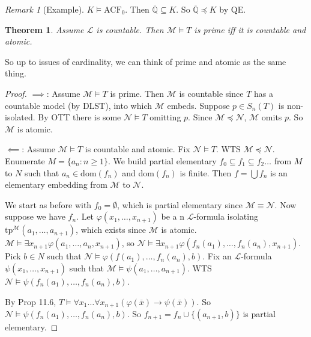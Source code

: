 \documentclass[]{article}
\theoremstyle{custhm}
\newtheorem{theorem}{Theorem}[section]
\theoremstyle{cusdef}
\theoremstyle{custhm}
\theoremstyle{custhm}
\theoremstyle{custhm}
\theoremstyle{ex}
\theoremstyle{custhm}
\theoremstyle{cusdef}
\theoremstyle{remark}
\newtheorem*{remark*}{Remark}
\theoremstyle{remark}
\newcommand{\Q}{\mathbb{Q}}
\newcommand{\ra}{\rightarrow}
\renewcommand{\L}{\mathcal{L}}
\newcommand{\M}{\mathcal{M}}
\renewcommand{\phi}{\varphi}
\renewcommand{\bar}{\overline}
\newcommand{\tp}{\textrm{tp}}
\newcommand{\N}{\mathcal{N}}
\newcommand{\acf}{\textrm{ACF}}
\renewcommand{\subset}{\subseteq}
\begin{document}
\begin{remark*}[Example]
$K\models \acf_0$. Then $\bar{\Q}\subseteq K$. So $\bar{\Q}\preceq K$ by QE.
\end{remark*}
\begin{theorem}
Assume $\L$ is countable. Then $\M\models T$ is prime iff it is countable and atomic.
\end{theorem}
So up to issues of cardinality, we can think of prime and atomic as the same thing.
\begin{proof}
$\implies$: Assume $\M\models T$ is prime. Then $\M$ is countable since $T$ has a countable model (by DLST), into which $\M$ embeds. Suppose $p \in S_n(T)$ is non-isolated. By OTT there is some $\N\models T$ omitting $p$. Since $\M\preceq\N$, $\M$ omits $p$. So $\M$ is atomic.

$\impliedby$: Assume $\M\models T$ is countable and atomic. Fix $\N\models T$. WTS $\M\preceq\N$. Enumerate $M = \{a_n:n\ge 1\}$. We build partial elementary $f_0\subset f_1\subset f_2\dots$ from $M$ to $N$ such that $a_n\in \textrm{dom}(f_n)$ and dom$(f_n)$ is finite. Then $f = \bigcup f_n$ is an elementary embedding from $\M$ to $\N$.

We start as before with $f_0 = \emptyset$, which is partial elementary since $\M\equiv \N$. Now suppose we have $f_n$. Let $\phi(x_1,\dots,x_{n+1})$ be a n $\L$-formula isolating $\tp^\M(a_1,\dots,a_{n+1})$, which exists since $\M$ is atomic. $\M\models \exists x_{n+1}\phi(a_1,\dots,a_n,x_{n+1})$, so $\N\models \exists x_{n+1}\phi(f_n(a_1),\dots,f_n(a_n),x_{n+1})$. Pick $b\in N$ such that $\N\models \phi(f(a_1),\dots,f_n(a_n),b)$. Fix an $\L$-formula $\psi(x_1,\dots,x_{n+1})$ such that $\M\models \psi(a_1,\dots,a_{n+1})$. WTS $\N\models \psi(f_n(a_1),\dots,f_n(a_n),b)$.

By Prop 11.6, $T\models \forall x_1\dots\forall x_{n+1}(\phi(\bar{x})\ra\psi(\bar{x}))$. So $\N\models \psi(f_n(a_1),\dots,f_n(a_n),b)$. So $f_{n+1} = f_n\cup\{(a_{n+1},b)\}$ is partial elementary.
\end{proof}
\end{document}
